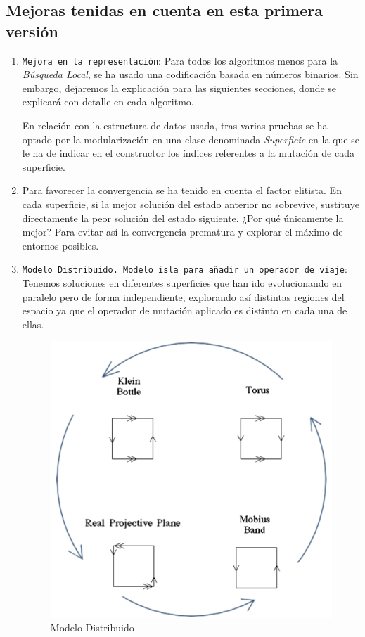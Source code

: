 \newpage 
\subsection{Mejoras tenidas en cuenta en esta primera versión}
\begin{enumerate}
	\item \texttt{Mejora en la representación}: Para todos los algoritmos menos para la \textit{Búsqueda Local}, se ha usado una codificación basada en números binarios. Sin embargo, dejaremos la explicación para las siguientes secciones, donde se explicará con detalle en cada algoritmo.
	
	En relación con la estructura de datos usada, tras varias pruebas se ha optado por la modularización en una clase denominada \textit{Superficie} en la que se le ha de indicar en el constructor los índices referentes a la mutación de cada superficie.
	
	

	
	\item Para favorecer la convergencia se ha tenido en cuenta el factor elitista. En cada superficie, si la mejor solución del estado anterior no sobrevive, sustituye directamente la peor solución del estado siguiente. ¿Por qué únicamente la mejor? Para evitar así la convergencia prematura y explorar el máximo de entornos posibles.
	
	\item \texttt{Modelo Distribuido. Modelo isla para añadir un operador de viaje}: Tenemos soluciones en diferentes superficies que han ido evolucionando en paralelo pero de forma independiente, explorando así distintas regiones del espacio ya que el operador de mutación aplicado es distinto en cada una de ellas. \\
	
	\begin{figure}[H]
		\centering
		\includegraphics[scale=0.3]{img/perf.png}
		\caption{Modelo Distribuido}
	\end{figure}
	

\end{enumerate}
